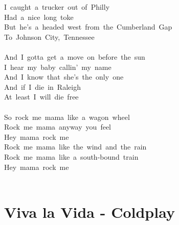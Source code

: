 \documentclass[]{book}
\let\stdsection\section
\renewcommand\section{\clearpage\stdsection}
\begin{document}
I~caught~a~trucker~out~of~Philly\\
Had~a~nice~long~toke\\
But~he's~a~headed~west~from~the~Cumberland~Gap\\
To~Johnson~City,~Tennessee\\
~\\
And~I~gotta~get~a~move~on~before~the~sun\\
I~hear~my~baby~callin'~my~name\\
And~I~know~that~she's~the~only~one\\
And~if~I~die~in~Raleigh\\
At~least~I~will~die~free\\
~\\
So~rock~me~mama~like~a~wagon~wheel\\
Rock~me~mama~anyway~you~feel\\
Hey~mama~rock~me\\
Rock~me~mama~like~the~wind~and~the~rain\\
Rock~me~mama~like~a~south-bound~train\\
Hey~mama~rock~me\\
~\\

\hypertarget{viva-la-vida---coldplay}{%
\section{Viva la Vida - Coldplay}\label{viva-la-vida---coldplay}}
\end{document}
